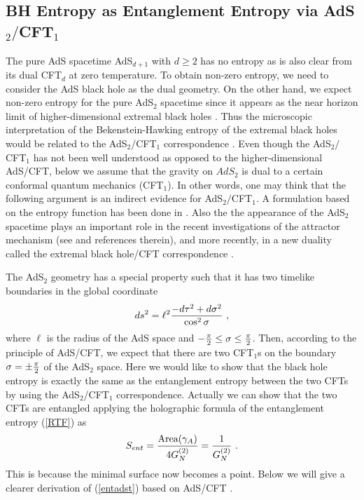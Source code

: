 \documentclass[12pt]{article}
\def\frac#1#2{{#1\over #2}}
\def\g{{\gamma}}
\def\f {\frac}
\def\frac#1#2{{#1\over #2}}
\def\g{{\gamma}}
\begin{document}
\subsection{BH Entropy as Entanglement Entropy via
  AdS$_2/$CFT$_1$}\label{secbhh}
\hspace{5mm}
The pure AdS spacetime AdS$_{d+1}$ with $d\ge 2$ has no entropy as is
also clear from its dual CFT$_d$ at zero temperature.
To obtain non-zero entropy, we need to consider the AdS black hole as
the dual geometry. On the other hand, we expect non-zero entropy for the
pure AdS$_2$ spacetime since it appears as the near horizon limit of higher-dimensional extremal black holes
\cite{Astefanesei:2006dd,Kunduri:2007vf,AY,Kunduri:2008rs,Kunduri:2008tk}.
Thus the microscopic interpretation of the Bekenstein-Hawking entropy of
the extremal black holes would be related to the AdS$_2$/CFT$_1$
correspondence \cite{Strominger:1998yg,HaSt}. Even though
the AdS$_2/$CFT$_1$ has not been well understood as opposed to the higher-dimensional AdS/CFT, below we assume that the gravity on $AdS_2$ is dual to a certain
conformal quantum mechanics (CFT$_1$). In other words, one may think that the following argument
is an indirect evidence for AdS$_2/$CFT$_1$.
A formulation based on
the entropy function has been done in \cite{Sen}. Also the
the appearance of
the AdS$_2$ spacetime plays an important role in the recent investigations
of the attractor mechanism (see \cite{Sen:2007qy} and references therein), and
more recently, in a new duality called the extremal black hole/CFT
correspondence \cite{Guica:2008mu,Hartman:2008pb}.


The AdS$_2$ geometry has a special property such that it has two
timelike boundaries in the global coordinate
\begin{align}\label{AdSmet}
 ds^2 = \ell^2 \frac{-d\tau^2 + d\sigma^2}{\cos^2\sigma} \ ,
\end{align}
where $\ell$ is the radius of the AdS space and $-\f{\pi}{2} \le \sigma \le \f{\pi}{2}$.
Then, according to the principle of AdS/CFT, we expect that there are
two CFT$_1$s on the
boundary $\sigma = \pm \f{\pi}{2}$ of the AdS$_2$ space.
Here we would like to show that the black hole entropy is exactly the
same as the entanglement entropy between the two CFTs by using the AdS$_2$/CFT$_1$
correspondence. Actually we can show that the two CFTs are entangled
applying the holographic formula of the entanglement entropy (\ref{RTF}) as
\begin{align}\label{entadst}
 S_{ent}=\f{\mbox{Area}(\g_A)}{4G^{(2)}_N}=\f{1}{G^{(2)}_N} \ .
\end{align}
This is because the minimal surface now becomes
a point. Below we will give a clearer derivation of (\ref{entadst})
based on AdS/CFT \cite{Azeyanagi:2007bj}.
\end{document}
